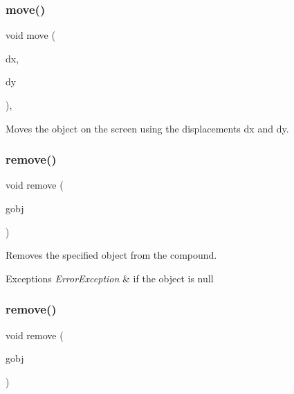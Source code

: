\subsubsection{\texorpdfstring{move()}{move()}}
{\footnotesize\ttfamily void move (\begin{DoxyParamCaption}\item[{double}]{dx,  }\item[{double}]{dy }\end{DoxyParamCaption})\hspace{0.3cm}{\ttfamily [virtual]}, {\ttfamily [inherited]}}



Moves the object on the screen using the displacements {\ttfamily dx} and {\ttfamily dy}. 

\mbox{\label{classsgl_1_1GCompound_a49dc57a2ce4caa354a5fff6acdde2e7d}} 
\subsubsection{\texorpdfstring{remove()}{remove()}\hspace{0.1cm}{\footnotesize\ttfamily [1/2]}}
{\footnotesize\ttfamily void remove (\begin{DoxyParamCaption}\item[{\mbox{\hyperlink{classsgl_1_1GObject}{G\+Object}} $\ast$}]{gobj }\end{DoxyParamCaption})\hspace{0.3cm}{\ttfamily [virtual]}}



Removes the specified object from the compound. 


\begin{DoxyExceptions}{Exceptions}
{\em Error\+Exception} & if the object is null \\
\hline
\end{DoxyExceptions}
\mbox{\label{classsgl_1_1GCompound_a0c0ae4d69b584602ff3cba0d9cf330a4}} 
\subsubsection{\texorpdfstring{remove()}{remove()}\hspace{0.1cm}{\footnotesize\ttfamily [2/2]}}
{\footnotesize\ttfamily void remove (\begin{DoxyParamCaption}\item[{\mbox{\hyperlink{classsgl_1_1GObject}{G\+Object}} \&}]{gobj }\end{DoxyParamCaption})\hspace{0.3cm}{\ttfamily [virtual]}}



